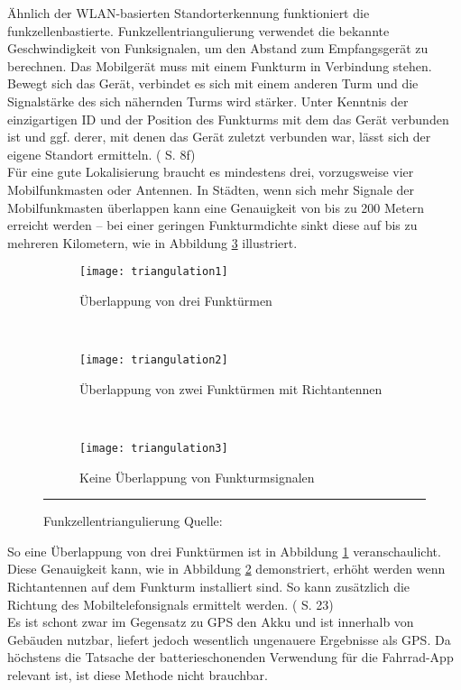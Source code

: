 Ähnlich der \gls{WLAN}-basierten Standorterkennung funktioniert die funkzellenbastierte. Funkzellentriangulierung verwendet die bekannte Geschwindigkeit von Funksignalen, um den Abstand zum Empfangsgerät zu berechnen. Das Mobilgerät muss mit einem Funkturm in Verbindung stehen. Bewegt sich das Gerät, verbindet es sich mit einem anderen Turm und die Signalstärke des sich nähernden Turms wird stärker. Unter Kenntnis der einzigartigen ID und der Position des Funkturms mit dem das Gerät verbunden ist und ggf. derer, mit denen das Gerät zuletzt verbunden war, lässt sich der eigene Standort ermitteln. (\cite{location} S. 8f) \\
Für eine gute Lokalisierung braucht es mindestens drei, vorzugsweise vier Mobilfunkmasten oder Antennen. In Städten, wenn sich mehr Signale der Mobilfunkmasten überlappen kann eine Genauigkeit von bis zu 200 Metern erreicht werden -- bei einer geringen Funkturmdichte sinkt diese auf bis zu mehreren Kilometern, wie in Abbildung \ref{fig:cell3} illustriert. 
\begin{figure}[H]
        \centering
        \begin{subfigure}[t]{0.32\textwidth}
                \texttt{[image: triangulation1]}
                \caption{Überlappung von drei Funktürmen}
                \label{fig:cell1}
        \end{subfigure}%
        ~ 
        \begin{subfigure}[t]{0.32\textwidth}
                \texttt{[image: triangulation2]}
                \caption{Überlappung von zwei Funktürmen mit Richtantennen}
                \label{fig:cell2}
        \end{subfigure}
         ~ 
        \begin{subfigure}[t]{0.32\textwidth}
                \texttt{[image: triangulation3]}
                \caption{Keine Überlappung von Funkturmsignalen}
                \label{fig:cell3}
        \end{subfigure}
        \rule{35em}{0.5pt}
        \caption[Funkzellentriangulierung]{Funkzellentriangulierung Quelle: \cite{fig:cell}}
        \label{fig:cell}
\end{figure}
So eine Überlappung von drei Funktürmen ist in Abbildung \ref{fig:cell1} veranschaulicht. Diese Genauigkeit kann, wie in Abbildung \ref{fig:cell2} demonstriert, erhöht werden wenn Richtantennen auf dem Funkturm installiert sind. So kann zusätzlich die Richtung des Mobiltelefonsignals ermittelt werden.  (\cite{gps} S. 23) \\
Es ist schont zwar im Gegensatz zu \gls{GPS} den Akku und ist innerhalb von Gebäuden nutzbar, liefert jedoch wesentlich ungenauere Ergebnisse als \gls{GPS}. Da höchstens die Tatsache der batterieschonenden Verwendung für die Fahrrad-\gls{App} relevant ist, ist diese Methode nicht brauchbar.  
